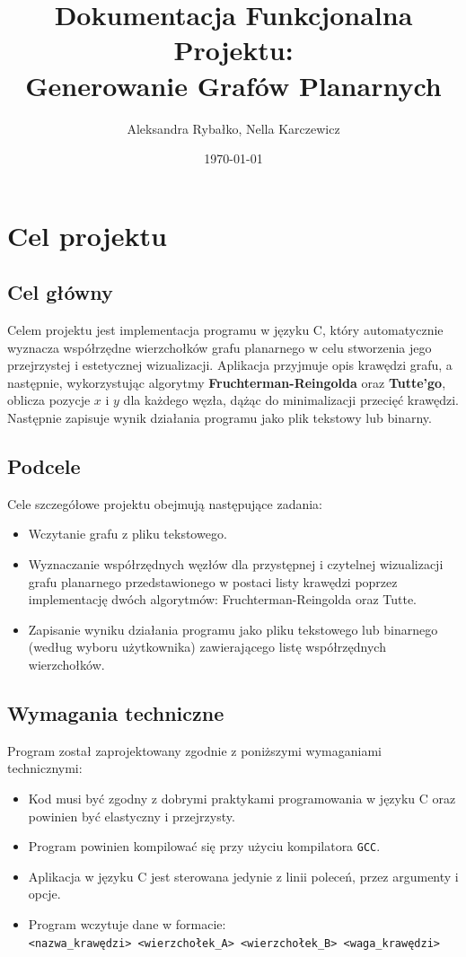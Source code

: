 \documentclass[12pt,a4paper]{article}
\title{Dokumentacja Funkcjonalna Projektu:\\ Generowanie Grafów Planarnych}
\author{Aleksandra Rybałko, Nella Karczewicz}
\date{\today}
\begin{document}
\maketitle

\section{Cel projektu}

\subsection{Cel główny}
Celem projektu jest implementacja programu w języku C, który automatycznie wyznacza współrzędne wierzchołków grafu planarnego w celu stworzenia jego przejrzystej i estetycznej wizualizacji. Aplikacja przyjmuje opis krawędzi grafu, a następnie, wykorzystując algorytmy \textbf{Fruchterman-Reingolda} oraz \textbf{Tutte’go}, oblicza pozycje $x$ i $y$ dla każdego węzła, dążąc do minimalizacji przecięć krawędzi. Następnie zapisuje wynik działania programu jako plik tekstowy lub binarny.

\subsection{Podcele}
Cele szczegółowe projektu obejmują następujące zadania:
\begin{itemize}[label=---]
    \item Wczytanie grafu z pliku tekstowego.
    \item Wyznaczanie współrzędnych węzłów dla przystępnej i czytelnej wizualizacji grafu planarnego przedstawionego w postaci listy krawędzi poprzez implementację dwóch algorytmów: Fruchterman-Reingolda oraz Tutte.
    \item Zapisanie wyniku działania programu jako pliku tekstowego lub binarnego (według wyboru użytkownika) zawierającego listę współrzędnych wierzchołków.
\end{itemize}

\subsection{Wymagania techniczne}
Program został zaprojektowany zgodnie z poniższymi wymaganiami technicznymi:
\begin{itemize}
    \item Kod musi być zgodny z dobrymi praktykami programowania w języku C oraz powinien być elastyczny i przejrzysty.
    \item Program powinien kompilować się przy użyciu kompilatora \texttt{GCC}.
    \item Aplikacja w języku C jest sterowana jedynie z linii poleceń, przez argumenty i opcje.
    \item Program wczytuje dane w formacie: \\
    \texttt{<nazwa\_krawędzi> <wierzchołek\_A> <wierzchołek\_B> <waga\_krawędzi>}
\end{itemize}
\end{document}
